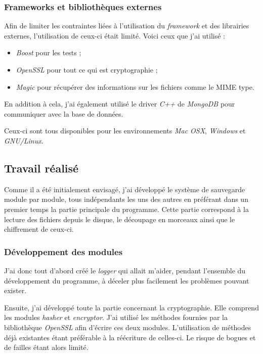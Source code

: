 \documentclass[a4paper,10pt, twoside]{report}
\begin{document}
\begin{spacing}{1.2}
\subsubsection{Frameworks et bibliothèques externes}

Afin de limiter les contraintes liées à l'utilisation du \textit{framework} et
des librairies externes, l'utilisation de ceux-ci était limité. Voici ceux que
j'ai utilisé :
\begin{itemize}
 \item \textit{Boost} pour les tests ;
 \item \textit{OpenSSL} pour tout ce qui est cryptographie ;
 \item \textit{Magic} pour récupérer des informations sur les fichiers comme le
 MIME type.
\end{itemize}

En addition à cela, j'ai également utilisé le driver \textit{C++} de
\textit{MongoDB} pour communiquer avec la base de données.

Ceux-ci sont tous disponibles pour les environnements \textit{Mac OSX},
\textit{Windows} et \textit{GNU/Linux}.

\subsection{Travail réalisé}

Comme il a été initialement envisagé, j'ai développé le système de sauvegarde
module par module, tous indépendants les uns des autres en préférant dans un
premier temps la partie principale du programme. Cette partie correspond à la
lecture des fichiers depuis le disque, le découpage en morceaux ainsi que le
chiffrement de ceux-ci.

\subsubsection{Développement des modules}

J'ai donc tout d'abord créé le \textit{logger} qui allait m'aider, pendant
l'ensemble du développement du programme, à déceler plus facilement les
problèmes pouvant exister.

Ensuite, j'ai développé toute la partie concernant la cryptographie. Elle
comprend les modules \textit{hasher} et \textit{encryptor}. J'ai utilisé les
méthodes fournies par la bibliothèque \textit{OpenSSL} afin d'écrire ces deux
modules. L'utilisation de méthodes déjà existantes étant préférable à la
réécriture de celles-ci. Le risque de bogues et de failles étant alors limité.


\end{spacing}
\end{document}
